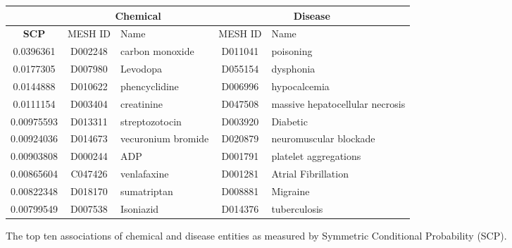 \documentclass[10pt, oneside]{article}
\begin{document}
\begin{figure}[h]
\begin{center}
\fontsize{9}{11}\selectfont
\begin{tabular}{|*{2}{c|}p{4.5cm}|c|p{4.5cm}|}\hline
 & \multicolumn{2}{c|}{\textbf{Chemical}} & \multicolumn{2}{c|}{\textbf{Disease}} \\ \hline 
 \textbf{SCP} & MESH ID   & Name                      & MESH ID   & Name                         \\ \hline
 0.0396361  & D002248   & carbon monoxide    & D011041   & poisoning                       \\ \hline
 0.0177305  & D007980   & Levodopa           & D055154   & dysphonia                       \\ \hline
 0.0144888  & D010622   & phencyclidine      & D006996   & hypocalcemia                    \\ \hline
 0.0111154  & D003404   & creatinine         & D047508   & massive hepatocellular necrosis \\ \hline
 0.00975593 & D013311   & streptozotocin     & D003920   & Diabetic                        \\ \hline
 0.00924036 & D014673   & vecuronium bromide & D020879   & neuromuscular blockade          \\ \hline
 0.00903808 & D000244   & ADP                & D001791   & platelet aggregations           \\ \hline
 0.00865604 & C047426   & venlafaxine        & D001281   & Atrial Fibrillation             \\ \hline
 0.00822348 & D018170   & sumatriptan        & D008881   & Migraine                        \\ \hline
 0.00799549 & D007538   & Isoniazid          & D014376   & tuberculosis                    \\ \hline
\end{tabular}
\caption{\label{fig:scp} The top ten associations of chemical and disease entities as measured by Symmetric Conditional Probability (SCP).}
\end{center}
\end{figure}
\end{document}
